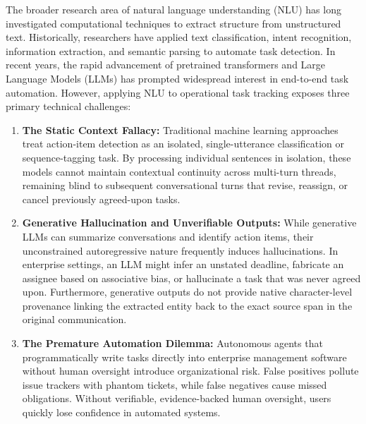 \documentclass[conference]{IEEEtran}
\begin{document}
The broader research area of natural language understanding (NLU) has long investigated computational techniques to extract structure from unstructured text. Historically, researchers have applied text classification, intent recognition, information extraction, and semantic parsing to automate task detection. In recent years, the rapid advancement of pretrained transformers and Large Language Models (LLMs) has prompted widespread interest in end-to-end task automation. However, applying NLU to operational task tracking exposes three primary technical challenges:
\begin{enumerate}
    \item \textbf{The Static Context Fallacy:} Traditional machine learning approaches treat action-item detection as an isolated, single-utterance classification or sequence-tagging task. By processing individual sentences in isolation, these models cannot maintain contextual continuity across multi-turn threads, remaining blind to subsequent conversational turns that revise, reassign, or cancel previously agreed-upon tasks.
    \item \textbf{Generative Hallucination and Unverifiable Outputs:} While generative LLMs can summarize conversations and identify action items, their unconstrained autoregressive nature frequently induces hallucinations. In enterprise settings, an LLM might infer an unstated deadline, fabricate an assignee based on associative bias, or hallucinate a task that was never agreed upon. Furthermore, generative outputs do not provide native character-level provenance linking the extracted entity back to the exact source span in the original communication.
    \item \textbf{The Premature Automation Dilemma:} Autonomous agents that programmatically write tasks directly into enterprise management software without human oversight introduce organizational risk. False positives pollute issue trackers with phantom tickets, while false negatives cause missed obligations. Without verifiable, evidence-backed human oversight, users quickly lose confidence in automated systems.
\end{enumerate}
\end{document}
